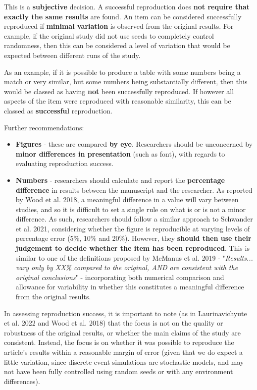 This is a \textbf{subjective} decision. A successful reproduction does \textbf{not require that exactly the same results} are found. An item can be considered successfully reproduced if \textbf{minimal variation} is observed from the original results. For example, if the original study did not use seeds to completely control randomness, then this can be considered a level of variation that would be expected between different runs of the study. 

As an example, if it is possible to produce a table with some numbers being a match or very similar, but some numbers being substantially different, then this would be classed as having \textbf{not} been successfully reproduced. If however all aspects of the item were reproduced with reasonable similarity, this can be classed as \textbf{successful} reproduction.

Further recommendations:
\begin{itemize}
    \item \textbf{Figures} - these are compared \textbf{by eye}. Researchers should be unconcerned by \textbf{minor differences in presentation} (such as font), with regards to evaluating reproduction success.
    \item \textbf{Numbers} - researchers should calculate and report the \textbf{percentage difference} in results between the manuscript and the researcher. As reported by Wood et al. 2018,\autocite{wood_push_2018, wood_replication_2018} a meaningful difference in a value will vary between studies, and so it is difficult to set a single rule on what is or is not a minor difference. As such, researchers should follow a similar approach to Schwander et al. 2021,\autocite{schwander_replication_2021} considering whether the figure is reproducible at varying levels of percentage error (5\%, 10\% and 20\%). However, they \textbf{should then use their judgement to decide whether the item has been reproduced}. This is similar to one of the definitions proposed by McManus et al. 2019\autocite{mcmanus_can_2019} - "\textit{Results... vary only by XX\% compared to the original, AND are consistent with the original conclusions}" - incorporating both numerical comparison and allowance for variability in whether this constitutes a meaningful difference from the original results.
\end{itemize}

In assessing reproduction success, it is important to note (as in Laurinavichyute et al. 2022\autocite{laurinavichyute_share_2022} and Wood et al. 2018\autocite{wood_push_2018}) that the focus is not on the quality or robustness of the original results, or whether the main claims of the study are consistent. Instead, the focus is on whether it was possible to reproduce the article's results within a reasonable margin of error (given that we do expect a little variation, since discrete-event simulations are stochastic models, and may not have been fully controlled using random seeds or with any environment differences).

